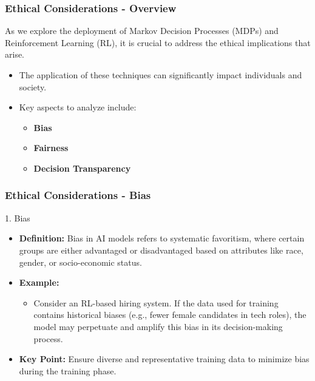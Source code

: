 \documentclass[aspectratio=169]{beamer}
\begin{document}
\begin{frame}[fragile]
    \frametitle{Ethical Considerations - Overview}
    As we explore the deployment of Markov Decision Processes (MDPs) and Reinforcement Learning (RL), it is crucial to address the ethical implications that arise. 
    \begin{itemize}
        \item The application of these techniques can significantly impact individuals and society.
        \item Key aspects to analyze include:
        \begin{itemize}
            \item \textbf{Bias}
            \item \textbf{Fairness}
            \item \textbf{Decision Transparency}
        \end{itemize}
    \end{itemize}
\end{frame}

\begin{frame}[fragile]
    \frametitle{Ethical Considerations - Bias}
    \begin{block}{1. Bias}
        \begin{itemize}
            \item \textbf{Definition:} Bias in AI models refers to systematic favoritism, where certain groups are either advantaged or disadvantaged based on attributes like race, gender, or socio-economic status.
            \item \textbf{Example:} 
                \begin{itemize}
                    \item Consider an RL-based hiring system. If the data used for training contains historical biases (e.g., fewer female candidates in tech roles), the model may perpetuate and amplify this bias in its decision-making process.
                \end{itemize}
            \item \textbf{Key Point:} Ensure diverse and representative training data to minimize bias during the training phase.
        \end{itemize}
    \end{block}
\end{frame}
\end{document}
